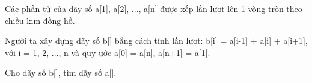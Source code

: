 Các phần tử của dãy số a[1], a[2], ..., a[n] được xếp lần lượt lên 1 vòng tròn theo chiều kim đồng hồ.  

   Người ta xây dựng dãy số b[] bằng cách tính lần lượt: b[i] = a[i-1] + a[i] + a[i+1], với i = 1, 2, ..., n và quy ước a[0] = a[n], a[n+1] = a[1].  

   Cho dãy số b[], tìm dãy số a[].